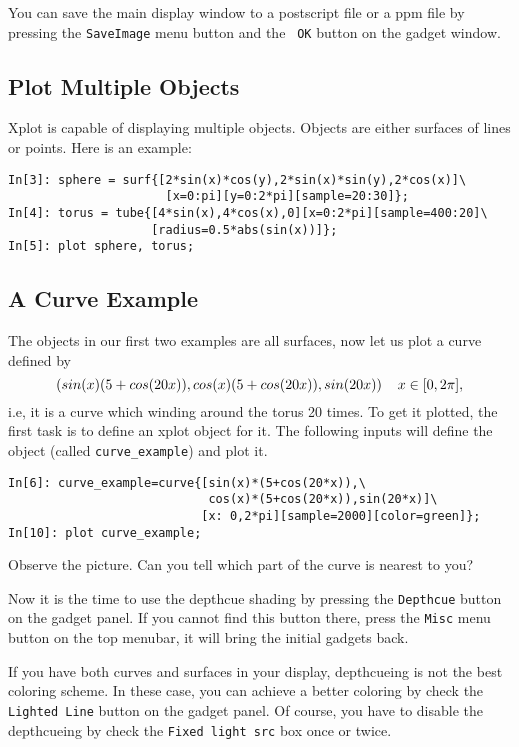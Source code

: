 You can save the main display window to a postscript file or 
a ppm file by
pressing the \verb+SaveImage+ menu button and the \verb+ OK+
button on the gadget window.



\subsection{Plot Multiple Objects}

Xplot is capable of displaying multiple objects. Objects are
either surfaces of lines or points. Here is an example:

\begin{verbatim}
In[3]: sphere = surf{[2*sin(x)*cos(y),2*sin(x)*sin(y),2*cos(x)]\
                      [x=0:pi][y=0:2*pi][sample=20:30]};
In[4]: torus = tube{[4*sin(x),4*cos(x),0][x=0:2*pi][sample=400:20]\
    	            [radius=0.5*abs(sin(x))]};
In[5]: plot sphere, torus;
\end{verbatim}

\subsection{A Curve Example}
The objects in our first two examples are all surfaces, now
let us plot a curve defined by
\begin{displaymath}
(sin(x)(5+cos(20x)),cos(x)(5+cos(20x)),sin(20x))\hspace{4mm} x\in
[0,2\pi],
\end{displaymath}
i.e, it is a curve which winding around the torus 20 times.
To get it plotted, the first task is to define
an xplot object for it. The following inputs will define
the object (called \verb+curve_example+) and plot it.

\begin{verbatim}
In[6]: curve_example=curve{[sin(x)*(5+cos(20*x)),\
                            cos(x)*(5+cos(20*x)),sin(20*x)]\
                           [x: 0,2*pi][sample=2000][color=green]};
In[10]: plot curve_example;
\end{verbatim}

Observe the picture. Can you tell which part of the curve is 
nearest to you? 

Now it is the time to use the depthcue shading by
pressing the \verb+Depthcue+ button on the
gadget panel. If you cannot find this button there, press
the \verb+Misc+ menu button on the top menubar, it will
bring the initial gadgets back.

If you have both curves and surfaces in your display, depthcueing
is not the best coloring scheme. In these case, you can achieve
a better coloring by check the \verb+Lighted Line+ button on the gadget
panel. Of course, you have to disable the depthcueing by check
the \verb+Fixed light src+ box once or twice.

